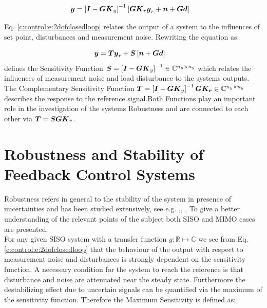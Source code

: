 \begin{align}
\begin{split}
\mbox{\boldmath$y$} &= \left[\mbox{\boldmath$I$} - \mbox{\boldmath$G$} \mbox{\boldmath$K$}_y\right]^{-1} \left[ \mbox{\boldmath$G$}\mbox{\boldmath$K$}_r \mbox{\boldmath$y$}_r + \mbox{\boldmath$n$} + \mbox{\boldmath$G$} \mbox{\boldmath$d$} \right]
\end{split}
\label{c:control:e:2dofclosedloop}
\end{align}

Eq. \ref{c:control:e:2dofclosedloop} relates the output of a system to the influences of set point, disturbances and measurement noise. 
Rewriting the equation as:

\begin{align}
\begin{split}
\mbox{\boldmath$y$} &= \mbox{\boldmath$T$}\mbox{\boldmath$y$}_r + \mbox{\boldmath$S$} \left[ \mbox{\boldmath$n$} + \mbox{\boldmath$G$} \mbox{\boldmath$d$} \right]
\end{split}
\label{c:control:e:sensitivityclosedloop}
\end{align}
defines the Sensitivity Function $\mbox{\boldmath$S$} = \left[ \mbox{\boldmath$I$} - \mbox{\boldmath$G$} \mbox{\boldmath$K$}_y\right]^{-1} \in \mathbb{C}^{n_y \times n_y}$ which relates the influences of measurement noise and load disturbance to the systems outputs. The Complementary Sensitivity Function $\mbox{\boldmath$T$} = \left[\mbox{\boldmath$I$} - \mbox{\boldmath$G$} \mbox{\boldmath$K$}_y\right]^{-1} \mbox{\boldmath$G$} \mbox{\boldmath$K_r$} \in \mathbb{C}^{n_y \times n_y}$ describes the response to the reference signal.Both Functions play an important role in the investigation of the systems Robustness and are connected to each other via $\mbox{\boldmath$T$} = \mbox{\boldmath$S$} \mbox{\boldmath$G$} \mbox{\boldmath$K$}_r$.\\

\section{Robustness and Stability of Feedback Control Systems}

Robustness refers in general to the stability of the system in presence of uncertainties and has been studied extensively, see e.g. \cite{Zhou1998EssentialsControl},\cite{Zhou1996RobustControl}, \cite{DoyleFeedbackTheory}.
To give a better understanding of the relevant points of the subject both SISO and MIMO cases are presented. \\

For any given SISO system with a transfer function $g : \mathbb{R} \mapsto \mathbb{C}$ we see from Eq. \ref{c:control:e:2dofclosedloop} that the behaviour of the output with respect to measurement noise and disturbances is strongly dependent on the sensitivity function. A necessary condition for the system to reach the reference is that disturbance and noise are attenuated  near the steady state. Furthermore the destabilizing effect due to uncertain signals can be quantified via the maximum of the sensitivity function. Therefore the Maximum Sensitivity is defined as:

